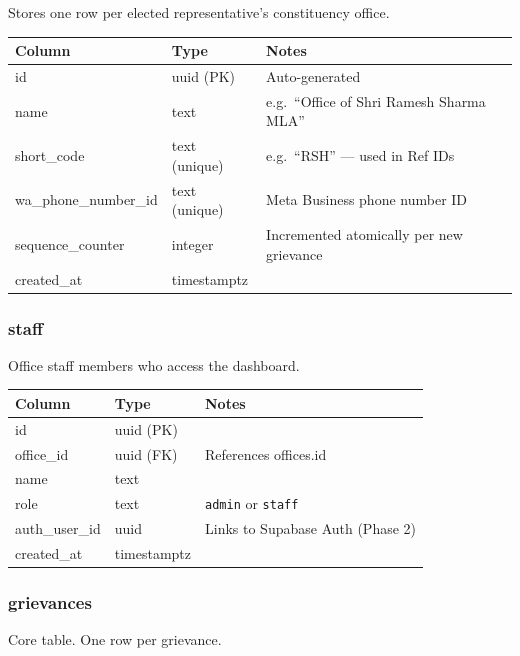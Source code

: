 \documentclass[11pt, a4paper]{article}
\begin{document}
Stores one row per elected representative's constituency office.

\renewcommand{\arraystretch}{1.3}
\begin{tabularx}{\linewidth}{llX}
\toprule
\textbf{Column} & \textbf{Type} & \textbf{Notes} \\
\midrule
id                  & uuid (PK)     & Auto-generated \\
name                & text          & e.g.\ ``Office of Shri Ramesh Sharma MLA'' \\
short\_code         & text (unique) & e.g.\ ``RSH'' — used in Ref IDs \\
wa\_phone\_number\_id & text (unique) & Meta Business phone number ID \\
sequence\_counter   & integer       & Incremented atomically per new grievance \\
created\_at         & timestamptz   & \\
\bottomrule
\end{tabularx}

\subsubsection{staff}

Office staff members who access the dashboard.

\begin{tabularx}{\linewidth}{llX}
\toprule
\textbf{Column} & \textbf{Type} & \textbf{Notes} \\
\midrule
id            & uuid (PK)   & \\
office\_id    & uuid (FK)   & References offices.id \\
name          & text        & \\
role          & text        & \texttt{admin} or \texttt{staff} \\
auth\_user\_id & uuid       & Links to Supabase Auth (Phase 2) \\
created\_at   & timestamptz & \\
\bottomrule
\end{tabularx}

\subsubsection{grievances}

Core table. One row per grievance.
\end{document}
